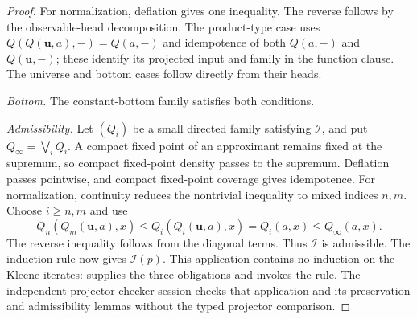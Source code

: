 \documentclass[11pt,a4paper]{article}
\theoremstyle{definition}
\theoremstyle{remark}
\newcommand{\lub}{\bigvee}
\begin{document}
\begin{proof}
For normalization, deflation gives one inequality. The reverse follows
by the observable-head decomposition. The product-type case uses
$Q(Q(\mathbf u,a),-)=Q(a,-)$ and idempotence of both $Q(a,-)$ and $Q(\mathbf u,-)$;
these identify its projected input and family in the function clause.
The universe and bottom cases follow directly from their heads.

\emph{Bottom.} The constant-bottom family satisfies both conditions.

\emph{Admissibility.} Let $(Q_i)$ be a small directed family satisfying
$\mathcal I$, and put $Q_\infty=\lub_iQ_i$. A compact fixed point of an
approximant remains fixed at the supremum,
so compact fixed-point density passes to the supremum. Deflation
passes pointwise, and compact fixed-point coverage gives idempotence.
For normalization, continuity
reduces the nontrivial inequality to mixed indices $n,m$. Choose
$i\geq n,m$ and use
\[
 Q_n(Q_m(\mathbf u,a),x)
 \leq Q_i(Q_i(\mathbf u,a),x)=Q_i(a,x)\leq Q_\infty(a,x).
\]
The reverse inequality follows from the diagonal terms.
Thus $\mathcal I$ is admissible. The induction rule now gives
$\mathcal I(p)$. This application contains no induction on the Kleene
iterates:  supplies the three
obligations and invokes the rule. The independent projector checker
session checks that application and its preservation and admissibility
lemmas without the typed projector comparison.
\end{proof}
\end{document}
